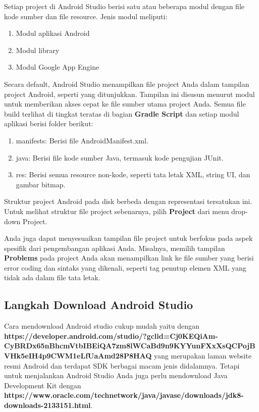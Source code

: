 Setiap project di Android Studio berisi satu atau beberapa modul dengan file kode sumber dan file resource. Jenis modul meliputi:
\begin{enumerate} 
   \item Modul aplikasi Android
    \item Modul library
    \item Modul Google App Engine
\end{enumerate}

Secara default, Android Studio menampilkan file project Anda dalam tampilan project Android, seperti yang ditunjukkan. Tampilan ini disusun menurut modul untuk memberikan akses cepat ke file sumber utama project Anda. Semua file build terlihat di tingkat teratas di bagian \textbf{Gradle Script} dan setiap modul aplikasi berisi folder berikut:
\begin{enumerate}
    \item manifests: Berisi file AndroidManifest.xml.
    \item java: Berisi file kode sumber Java, termasuk kode pengujian JUnit.
    \item res: Berisi semua resource non-kode, seperti tata letak XML, string UI, dan gambar bitmap.
\end{enumerate}

Struktur project Android pada disk berbeda dengan representasi tersatukan ini. Untuk melihat struktur file project sebenarnya, pilih \textbf{Project} dari menu drop-down Project.

Anda juga dapat menyesuaikan tampilan file project untuk berfokus pada aspek spesifik dari pengembangan aplikasi Anda. Misalnya, memilih tampilan \textbf{Problems} pada project Anda akan menampilkan link ke file sumber yang berisi error coding dan sintaks yang dikenali, seperti tag penutup elemen XML yang tidak ada dalam file tata letak.

\subsection{Langkah Download Android Studio}
Cara mendownload Android studio cukup mudah yaitu dengan \textbf{https://developer.android.com/studio/?gclid=Cj0KEQiAm-CyBRDx65nBhcmVtbIBEiQA7zm8lWCaBd9n9KYYunFXxXsQCPojBVHk5eIH4p9CWM1eLfUaAmd28P8HAQ} yang merupakan laman website resmi Android dan terdapat SDK berbagai macam jenis didalamnya. Tetapi untuk menjalankan Android Studio Anda juga perlu mendownload Java Development Kit dengan \textbf{https://www.oracle.com/technetwork/java/javase/downloads/jdk8-downloads-2133151.html}.

